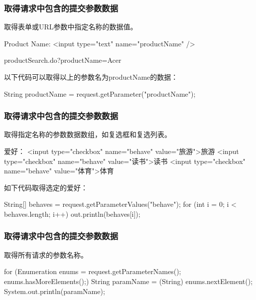 \begin{frame} %
  \frametitle{取得请求中包含的提交参数数据} 
  
   取得表单或URL参数中指定名称的数据值。


  \begin{xmlCode}
    Product Name: <input type="text" name="productName" />
  \end{xmlCode}

  
  \begin{xmlCode}
    productSearch.do?productName=Acer    
  \end{xmlCode}

  以下代码可以取得以上的参数名为productName的数据：
  
  \begin{javaCode}
    String productName = request.getParameter("productName");
  \end{javaCode}
\end{frame}

\begin{frame} %
  \frametitle{取得请求中包含的提交参数数据} 

   取得指定名称的参数数据数组，如复选框和复选列表。

  
  \begin{xmlCode}
    爱好：
    <input type="checkbox" name="behave" value="旅游">旅游
    <input type="checkbox" name="behave" value="读书">读书
    <input type="checkbox" name="behave" value="体育">体育
  \end{xmlCode}

  如下代码取得选定的爱好：

  \begin{javaCode}
    String[] behaves = request.getParameterValues("behave");
    for (int i = 0; i < behaves.length; i++) {
      out.println(behaves[i]);
    }
  \end{javaCode}
\end{frame}

\begin{frame}[fragile] %
  \frametitle{取得请求中包含的提交参数数据} 
   取得所有请求的参数名称。

  \begin{javaCode}
    for (Enumeration enums = request.getParameterNames(); enums.hasMoreElements();) {
      String paramName = (String) enums.nextElement();
      System.out.println(paramName);
    }
  \end{javaCode}
\end{frame}

